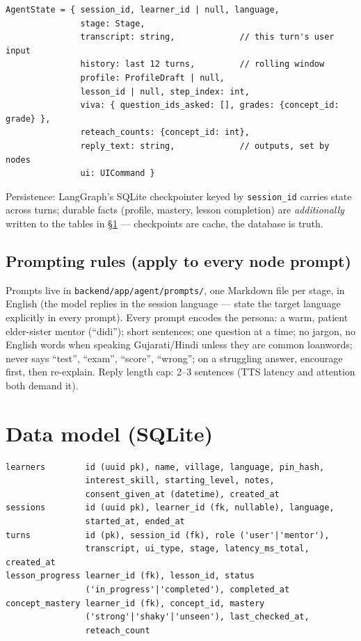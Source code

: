 \documentclass[11pt]{article}
\newcommand{\code}[1]{\texttt{#1}}
\begin{document}
\begin{verbatim}
AgentState = { session_id, learner_id | null, language,
               stage: Stage,
               transcript: string,             // this turn's user input
               history: last 12 turns,         // rolling window
               profile: ProfileDraft | null,
               lesson_id | null, step_index: int,
               viva: { question_ids_asked: [], grades: {concept_id: grade} },
               reteach_counts: {concept_id: int},
               reply_text: string,             // outputs, set by nodes
               ui: UICommand }
\end{verbatim}

Persistence: LangGraph's SQLite checkpointer keyed by \code{session\_id} carries state across turns; durable facts (profile, mastery, lesson completion) are \emph{additionally} written to the tables in \S\ref{sec:data} --- checkpoints are cache, the database is truth.

\subsection{Prompting rules (apply to every node prompt)}

Prompts live in \code{backend/app/agent/prompts/}, one Markdown file per stage, in English (the model replies in the session language --- state the target language explicitly in every prompt). Every prompt encodes the persona: a warm, patient elder-sister mentor (``didi''); short sentences; one question at a time; no jargon, no English words when speaking Gujarati/Hindi unless they are common loanwords; never says ``test'', ``exam'', ``score'', ``wrong''; on a struggling answer, encourage first, then re-explain. Reply length cap: 2--3 sentences (TTS latency and attention both demand it).

\section{Data model (SQLite)}
\label{sec:data}

\begin{verbatim}
learners        id (uuid pk), name, village, language, pin_hash,
                interest_skill, starting_level, notes,
                consent_given_at (datetime), created_at
sessions        id (uuid pk), learner_id (fk, nullable), language,
                started_at, ended_at
turns           id (pk), session_id (fk), role ('user'|'mentor'),
                transcript, ui_type, stage, latency_ms_total, created_at
lesson_progress learner_id (fk), lesson_id, status
                ('in_progress'|'completed'), completed_at
concept_mastery learner_id (fk), concept_id, mastery
                ('strong'|'shaky'|'unseen'), last_checked_at,
                reteach_count
\end{verbatim}
\end{document}
